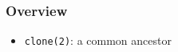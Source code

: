 \begin{frame}

\frametitle{Overview}

\begin{itemize}

\item \texttt{clone(2)}: a common ancestor

\end{itemize}

\end{frame}
